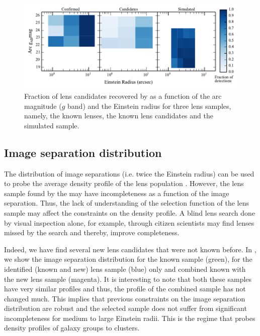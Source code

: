 \documentclass[useAMS,usenatbib,a4paper]{mn2e}
\begin{document}
\begin{figure}
\begin{center}
\includegraphics[scale=1.0]{sw-cfhtls-figs/comp_reinst_mag.pdf}
\caption{ \label{fig:compre} Fraction of lens candidates recovered by \sw as a
function of the arc magnitude ($g$ band) and the Einstein radius for three lens
samples, namely, the known lenses, the known lens candidates and the simulated
sample. }
\end{center}
\end{figure}


\subsection{Image separation distribution}
\label{sec:results:isd}

The distribution of image separations (i.e. twice the Einstein radius)
can be used to probe the average density profile of the lens population
\citep{Oguri2006,More2012}.  However, the lens sample found by the \af
may have incompleteness as a function of the image separation. Thus, the
lack of understanding of the selection function of the lens sample may
affect the constraints on the density profile. A blind lens search done
by visual inspection alone, for example, through \sw citizen scientists may find
lenses missed by the \af search and thereby, improve completeness.

Indeed, we have find several new lens candidates that were not known
before. In , we show the image separation distribution for
the known sample (green), for the \sw identified (known and new) lens
sample (blue) only and combined known with the new \sw lens sample
(magenta). It is interesting to note that both these samples have very
similar profiles and thus, the profile of the combined sample has not
changed much. This implies that previous constraints on the image
separation distribution are robust and the \af selected sample does not
suffer from significant incompleteness for medium to large Einstein
radii. This is the regime that probes density profiles of galaxy groups
to clusters.
\end{document}
